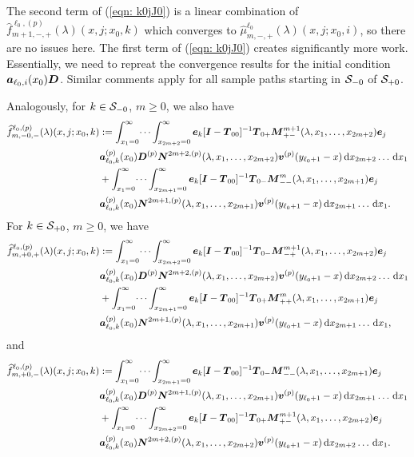 The second term of (\ref{eqn: k0jJ0}) is a linear combination of \(\widehat{f}_{m+1,-,+}^{\ell_0,(p)}(\lambda)(x,j;x_0,k)\) which converges to \(\widehat \mu_{m,-,+}^{\ell_0}(\lambda)(x,j;x_0,i)\), so there are no issues here. The first term of (\ref{eqn: k0jJ0}) creates significantly more work. Essentially, we need to repreat the convergence results for the initial condition \(\boldsymbol a_{\ell_0,i}(x_0)\boldsymbol D\). Similar comments apply for all sample paths starting in \(\mathcal{S}_{-0}\) of \(\mathcal{S}_{+0}\).

Analogously, for \(k\in\mathcal{S}_{-0}\), \(m\geq 0\), we also have 
\begin{align*}
	\widehat{f}_{m,-0,-}^{\ell_0,(p)}(\lambda)(x,j;x_0,k)\nonumber 
	&:=\int_{x_1=0}^\infty \dots \int_{x_{2m+2}=0}^\infty  \boldsymbol e_k [\boldsymbol I - \boldsymbol T_{00}]^{-1}\boldsymbol T_{0+} \boldsymbol M^{m+1}_{+-}(\lambda,x_1,\dots,x_{2m+2})\boldsymbol e_j \nonumber
	\\& \boldsymbol a_{\ell_0,k}^{(p)}(x_0) \boldsymbol D^{(p)} \boldsymbol N^{2m+2,(p)}(\lambda,x_1,\dots,x_{2m+2}) {\boldsymbol v}^{(p)}(y_{\ell_0+1}-x)\, \mathrm{d} x_{2m+2}\dots  \, \mathrm{d} x_1  \nonumber
	\\& + \int_{x_1=0}^\infty \dots \int_{x_{2m+1}=0}^\infty  \boldsymbol e_k [\boldsymbol I - \boldsymbol T_{00}]^{-1}\boldsymbol T_{0-} \boldsymbol M^{m}_{--}(\lambda,x_1,\dots,x_{2m+1})\boldsymbol e_j \nonumber
	\\& \boldsymbol a_{\ell_0,k}^{(p)}(x_0)\boldsymbol N^{2m+1,(p)}(\lambda,x_1,\dots,x_{2m+1}) {\boldsymbol v}^{(p)}(y_{\ell_0+1}-x)\, \mathrm{d} x_{2m+1}\dots\, \mathrm{d} x_1.
\end{align*}
For \(k\in\mathcal{S}_{+0}\), \(m\geq 0\), we have 
\begin{align*}
	\widehat{f}_{m,+0,+}^{\ell_0,(p)}(\lambda)(x,j;x_0,k)\nonumber 
	&:=\int_{x_1=0}^\infty \dots \int_{x_{2m+2}=0}^\infty \boldsymbol e_k [\boldsymbol I - \boldsymbol T_{00}]^{-1}\boldsymbol T_{0-} \boldsymbol M^{m+1}_{-+}(\lambda,x_1,\dots,x_{2m+2})\boldsymbol e_j \nonumber
	\\& \boldsymbol a_{\ell_0,k}^{(p)}(x_0) \boldsymbol D^{(p)} \boldsymbol N^{2m+2,(p)}(\lambda,x_1,\dots,x_{2m+2}) {\boldsymbol v}^{(p)}(y_{\ell_0+1}-x)\, \mathrm{d} x_{2m+2}\dots  \, \mathrm{d} x_1  \nonumber
	\\& + \int_{x_1=0}^\infty \dots \int_{x_{2m+1}=0}^\infty  \boldsymbol e_k [\boldsymbol I - \boldsymbol T_{00}]^{-1}\boldsymbol T_{0+} \boldsymbol M^m_{++}(\lambda,x_1,\dots,x_{2m+1})\boldsymbol e_j \nonumber
	\\& \boldsymbol a_{\ell_0,k}^{(p)}(x_0)\boldsymbol N^{2m+1,(p)}(\lambda,x_1,\dots,x_{2m+1}) {\boldsymbol v}^{(p)}(y_{\ell_0+1}-x)\, \mathrm{d} x_{2m+1}\dots  \, \mathrm{d} x_1,
\end{align*}
and 
\begin{align*}
	\widehat{f}_{m,+0,-}^{\ell_0,(p)}(\lambda)(x,j;x_0,k)\nonumber 
	&:=\int_{x_1=0}^\infty \dots \int_{x_{2m+1}=0}^\infty  \boldsymbol e_k [\boldsymbol I - \boldsymbol T_{00}]^{-1}\boldsymbol T_{0-} \boldsymbol M^m_{--}(\lambda,x_1,\dots,x_{2m+1})\boldsymbol e_j \nonumber
	\\& \boldsymbol a_{\ell_0,k}^{(p)}(x_0) \boldsymbol D^{(p)} \boldsymbol N^{2m+1,(p)}(\lambda,x_1,\dots,x_{2m+1}) {\boldsymbol v}^{(p)}(y_{\ell_0+1}-x)\, \mathrm{d} x_{2m+1}\dots  \, \mathrm{d} x_1  \nonumber
	\\& + \int_{x_1=0}^\infty \dots \int_{x_{2m+2}=0}^\infty  \boldsymbol e_k [\boldsymbol I - \boldsymbol T_{00}]^{-1}\boldsymbol T_{0+} \boldsymbol M^{m+1}_{+-}(\lambda,x_1,\dots,x_{2m+2})\boldsymbol e_j \nonumber
	\\& \boldsymbol a_{\ell_0,k}^{(p)}(x_0)\boldsymbol N^{2m+2,(p)}(\lambda,x_1,\dots,x_{2m+2}) {\boldsymbol v}^{(p)}(y_{\ell_0+1}-x)\, \mathrm{d} x_{2m+2}\dots  \, \mathrm{d} x_1.
\end{align*}
